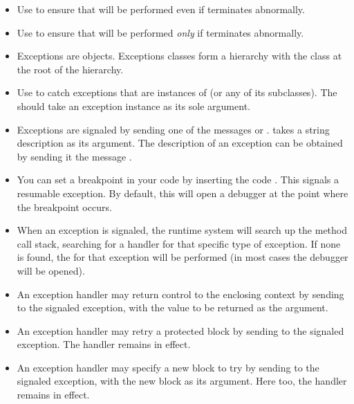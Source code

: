 \documentclass[a4paper,10pt,twoside]{book}
\begin{document}
\begin{itemize}
\item Use  to ensure that  will be performed even if  terminates abnormally.

\item Use  to ensure that  will be performed \emph{only} if  terminates abnormally.

\item Exceptions are objects. Exceptions classes form a hierarchy with the class  at the root of the hierarchy.

\item Use  to catch exceptions that are instances of  (or any of its subclasses). The  should take an exception instance as its sole argument.

\item Exceptions are signaled by sending one of the messages  or .  takes a string description as its argument. The description of an exception can be obtained by sending it the message .

\item You can set a breakpoint in your code by inserting the code . This signals a resumable  exception. By default, this will open a debugger at the point where the breakpoint occurs.

\item When an exception is signaled, the runtime system will search up the method call stack, searching for a handler for that specific type of exception. If none is found, the  for that exception will be performed (\ie in most cases the debugger will be opened).

\item An exception handler may return control to the enclosing context by sending  to the signaled exception, with the value to be returned as the argument.

\item An exception handler may retry a protected block by sending  to the signaled exception. The handler remains in effect.

\item An exception handler may specify a new block to try by sending  to the signaled exception, with the new block as its argument. Here too, the handler remains in effect.

\end{itemize}
\end{document}
